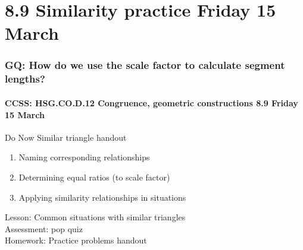 \documentclass{beamer}
\begin{document}
\section{8.9 Similarity practice Friday 15 March}
  \frame
  {
    \frametitle{GQ: How do we use the scale factor to calculate segment lengths?}
    \framesubtitle{CCSS: HSG.CO.D.12 Congruence, geometric constructions \hfill \alert{8.9 Friday 15 March}}

    \begin{block}{Do Now Similar triangle handout}
      \begin{enumerate}
        \item Naming corresponding relationships
        \item Determining equal ratios (to scale factor)
        \item Applying similarity relationships in situations
      \end{enumerate}
    \end{block}
    Lesson: Common situations with similar triangles\\
    Assessment: pop quiz\\[0.5cm]
    Homework: Practice problems handout
  }
\end{document}
